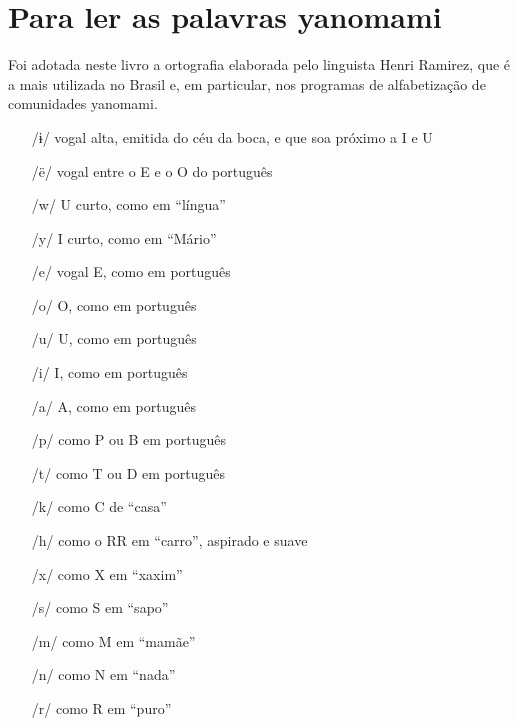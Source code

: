 \chapter{Para ler as palavras yanomami}


Foi adotada neste livro a ortografia elaborada pelo linguista Henri Ramirez, que é a mais utilizada no Brasil e, em particular, nos programas de alfabetização de comunidades yanomami. 

\begin{itemize}
\item[/ɨ/] vogal alta, emitida do céu da boca, e que soa próximo a I e U
\item[/ë/] vogal entre o E e o O do português
\item[/w/] U curto, como em “língua”
\item[/y/] I curto, como em “Mário”
\item[/e/] vogal E, como em português
\item[/o/] O, como em português
\item[/u/] U, como em português
\item[/i/] I, como em português
\item[/a/] A, como em português
\item[/p/] como P ou B em português
\item[/t/] como T ou D em português
\item[/k/] como C de “casa”
\item[/h/] como o RR em “carro”, aspirado e suave
\item[/x/] como X em “xaxim”
\item[/s/] como S em “sapo”
\item[/m/] como M em “mamãe”
\item[/n/] como N em “nada”
\item[/r/] como R em “puro”
\end{itemize}